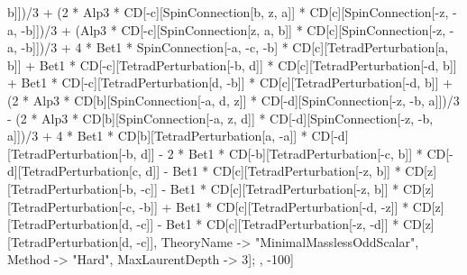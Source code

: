 b]])/3 + (2 * Alp3 * CD[-c][SpinConnection[b, z, a]] * CD[c][SpinConnection[-z, -a, -b]])/3 + (Alp3 * CD[-c][SpinConnection[z, a, b]] * CD[c][SpinConnection[-z, -a, -b]])/3 + 4 * Bet1 * SpinConnection[-a, -c, -b] * CD[c][TetradPerturbation[a, b]] + Bet1 * CD[-c][TetradPerturbation[-b, d]] * CD[c][TetradPerturbation[-d, b]] + Bet1 * CD[-c][TetradPerturbation[d, -b]] * CD[c][TetradPerturbation[-d, b]] + (2 * Alp3 * CD[b][SpinConnection[-a, d, z]] * CD[-d][SpinConnection[-z, -b, a]])/3 - (2 * Alp3 * CD[b][SpinConnection[-a, z, d]] * CD[-d][SpinConnection[-z, -b, a]])/3 + 4 * Bet1 * CD[b][TetradPerturbation[a, -a]] * CD[-d][TetradPerturbation[-b, d]] - 2 * Bet1 * CD[-b][TetradPerturbation[-c, b]] * CD[-d][TetradPerturbation[c, d]] - Bet1 * CD[c][TetradPerturbation[-z, b]] * CD[z][TetradPerturbation[-b, -c]] - Bet1 * CD[c][TetradPerturbation[-z, b]] * CD[z][TetradPerturbation[-c, -b]] + Bet1 * CD[c][TetradPerturbation[-d, -z]] * CD[z][TetradPerturbation[d, -c]] - Bet1 * CD[c][TetradPerturbation[-z, -d]] * CD[z][TetradPerturbation[d, -c]], TheoryName -> "MinimalMasslessOddScalar", Method -> "Hard", MaxLaurentDepth -> 3]; , -100]